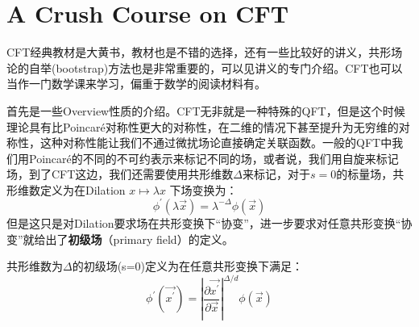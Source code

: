 \part{A Crush Course on CFT}
\setcounter{theorem}{0}
\setcounter{definition}{0}
\setcounter{lemma}{0}
\setcounter{sidenote}{1}

CFT经典教材是大黄书\cite{DiFrancesco:1997nk}，教材\cite{Blumenhagen:2009zz,ito}也是不错的选择，还有一些比较好的讲义\cite{Nawata:2022lsw,Ginsparg:1988ui,Qualls:2015qjb}，共形场论的自举(bootstrap)方法也是非常重要的，可以见讲义\cite{Ribault:2014hia}的专门介绍。CFT也可以当作一门数学课来学习，偏重于数学的阅读材料有\cite{Schottenloher:2008zz}。

首先是一些Overview性质的介绍。CFT无非就是一种特殊的QFT，但是这个时候理论具有比Poincar\'e对称性更大的对称性，在二维的情况下甚至提升为无穷维的对称性，这种对称性能让我们不通过微扰场论直接确定关联函数。一般的QFT中我们用Poincar\'e的不同的不可约表示来标记不同的场，或者说，我们用自旋来标记场，到了CFT这边，我们还需要使用共形维数$\Delta$来标记，对于$s=0$的标量场，共形维数定义为在Dilation $x\mapsto\lambda x$ 下场变换为：
\begin{equation}
	\phi^\prime(\lambda \vec{x})=\lambda^{-\Delta}\phi(\vec x)
\end{equation}
但是这只是对Dilation要求场在共形变换下“协变”，进一步要求对任意共形变换“协变”就给出了\textbf{初级场}（primary field）的定义。
\begin{definition}
	共形维数为$\Delta$的初级场(s=0)定义为在任意共形变换下满足：
	\begin{equation}
		\phi^\prime(\vec{x^\prime})=\left|\frac{\partial \vec {x^\prime}}{\partial \vec {x}}\right|^{\Delta/d}\phi(\vec {x})
	\end{equation}
\end{definition}


